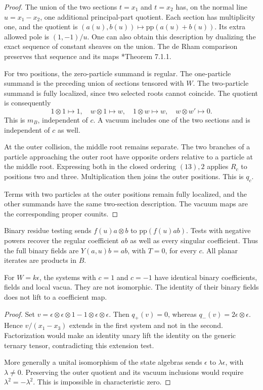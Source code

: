 \begin{proof}
The union of the two sections $t=x_1$ and $t=x_2$ has, on the
normal line $u=x_1-x_2$, one additional principal-part quotient.
Each section has multiplicity one, and the quotient is
$(a(u),b(u))\mapsto\mathrm{pp}(a(u)+b(u))$. Its extra allowed pole
is $(1,-1)/u$. One can also obtain this description by dualizing
the exact sequence of constant sheaves on the union. The de Rham
comparison preserves that sequence and its maps
\cite{cycmp:HTT}*{Theorem 7.1.1}.

For two positions, the zero-particle summand is regular. The
one-particle summand is the preceding union of sections tensored
with $W$. The two-particle summand is fully localized, since two
selected roots cannot coincide. The quotient is consequently
\[
 1\otimes1\mapsto1,\quad w\otimes1\mapsto w,
 \quad1\otimes w\mapsto w,
 \quad w\otimes w'\mapsto0.
\]
This is $m_B$, independent of $c$. A vacuum includes one of the
two sections and is independent of $c$ as well.

At the outer collision, the middle root remains separate. The two
branches of a particle approaching the outer root have opposite
orders relative to a particle at the middle root. Expressing both
in the closed ordering $(13),2$ applies $R_c$ to positions two and
three. Multiplication then joins the outer positions. This is
$q_c$.

Terms with two particles at the outer positions remain fully
localized, and the other summands have the same two-section
description. The vacuum maps are the corresponding proper counits.
\end{proof}

Binary residue testing sends $f(u)a\otimes b$ to
$\mathrm{pp}(f(u)ab)$. Tests with negative powers recover the
regular coefficient $ab$ as well as every singular coefficient.
Thus the full binary fields are $Y(a,u)b=ab$, with $T=0$,
for every $c$. All planar iterates are products in $B$.

\begin{proposition}\label{cycmp:prop:particle-distinction}
For $W=k\epsilon$, the systems with $c=1$ and $c=-1$ have identical
binary coefficients, fields and local vacua. They are not isomorphic.
The identity of their binary fields does not lift to a coefficient map.
\end{proposition}

\begin{proof}
Set $v=\epsilon\otimes\epsilon\otimes1-
1\otimes\epsilon\otimes\epsilon$. Then $q_+(v)=0$, whereas
$q_-(v)=2\epsilon\otimes\epsilon$. Hence $v/(x_1-x_3)$ extends in
the first system and not in the second. Factorization would make an
identity unary lift the identity on the generic ternary tensor,
contradicting this extension test.

More generally a unital isomorphism of the state algebras sends
$\epsilon$ to $\lambda\epsilon$, with $\lambda\ne0$. Preserving the
outer quotient and its vacuum inclusions would require
$\lambda^2=-\lambda^2$. This is impossible in characteristic zero.
\end{proof}

